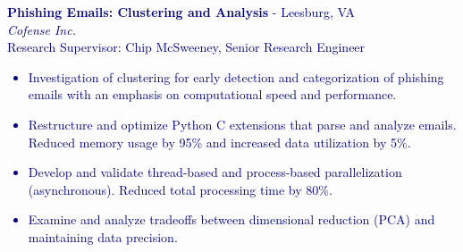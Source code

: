 \documentclass[hidelinks, 10pt]{article}
\newcommand{\bodyspacing}{1mm}
\begin{document}
\begin{textblock}{8.75}
    \textcolor{navy}{\textbf{Phishing Emails: Clustering and Analysis} - Leesburg, VA\\
        \emph{Cofense Inc.}\\
        Research Supervisor: Chip McSweeney, Senior Research Engineer
        \makeatletter
        \def\@listi{\orig@listi\topsep=0.3\baselineskip}
        \makeatother
        \begin{itemize}[leftmargin=5mm]
            \setlength\itemsep{-0.25em}
            \item Investigation of clustering for early detection and
                  categorization of phishing emails with an emphasis on computational speed and performance.
            \item Restructure and optimize Python C extensions that parse and
                  analyze emails.  Reduced memory usage by 95\% and increased data utilization by 5\%.
            \item Develop and validate thread-based and process-based
                  parallelization (asynchronous).  Reduced total processing time by 80\%.
            \item Examine and analyze tradeoffs between dimensional reduction
                  (PCA) and maintaining data precision.
        \end{itemize}}



    \vspace{2mm}



\end{textblock}
\end{document}
